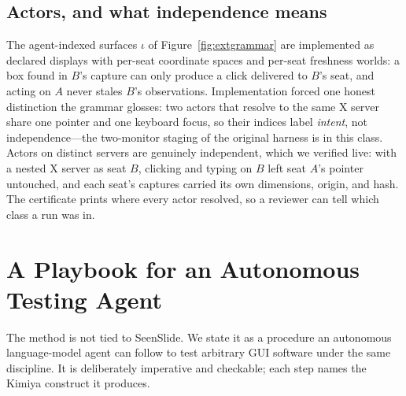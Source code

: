 \documentclass[acmsmall,screen,nonacm]{acmart}
\theoremstyle{acmdefinition}%
\theoremstyle{acmplain}%
\begin{document}
\subsection{Actors, and what independence means}

The agent-indexed surfaces $\iota$ of Figure~\ref{fig:extgrammar} are
implemented as declared displays with per-seat coordinate spaces and
per-seat freshness worlds: a box found in $B$'s capture can only produce
a click delivered to $B$'s seat, and acting on $A$ never stales $B$'s
observations. Implementation forced one honest distinction the grammar
glosses: two actors that resolve to the same X server share one pointer
and one keyboard focus, so their indices label \emph{intent}, not
independence---the two-monitor staging of the original harness is in
this class. Actors on distinct servers are genuinely independent, which
we verified live: with a nested X server as seat $B$, clicking and
typing on $B$ left seat $A$'s pointer untouched, and each seat's
captures carried its own dimensions, origin, and hash. The certificate
prints where every actor resolved, so a reviewer can tell which class a
run was in.

\section{A Playbook for an Autonomous Testing Agent}
\label{sec:playbook}

The method is not tied to SeenSlide. We state it as a procedure an
autonomous language-model agent can follow to test arbitrary GUI software
under the same discipline. It is deliberately imperative and checkable;
each step names the Kimiya construct it produces.
\end{document}
